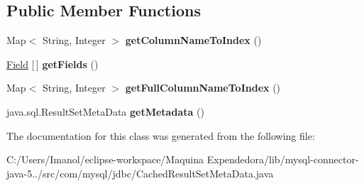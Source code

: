 \subsection*{Public Member Functions}
\begin{DoxyCompactItemize}
\item 
\mbox{\label{classcom_1_1mysql_1_1jdbc_1_1_cached_result_set_meta_data_ac531dfc6581f67cec568ff305a392794}} 
Map$<$ String, Integer $>$ {\bfseries get\+Column\+Name\+To\+Index} ()
\item 
\mbox{\label{classcom_1_1mysql_1_1jdbc_1_1_cached_result_set_meta_data_a72c9658d05d246f0f987bb474e15ce94}} 
\mbox{\hyperlink{classcom_1_1mysql_1_1jdbc_1_1_field}{Field}} \mbox{[}$\,$\mbox{]} {\bfseries get\+Fields} ()
\item 
\mbox{\label{classcom_1_1mysql_1_1jdbc_1_1_cached_result_set_meta_data_add18c14773251a3b33b3010b7f244120}} 
Map$<$ String, Integer $>$ {\bfseries get\+Full\+Column\+Name\+To\+Index} ()
\item 
\mbox{\label{classcom_1_1mysql_1_1jdbc_1_1_cached_result_set_meta_data_a85a7e773a09d9eb72922873df4150cd4}} 
java.\+sql.\+Result\+Set\+Meta\+Data {\bfseries get\+Metadata} ()
\end{DoxyCompactItemize}


The documentation for this class was generated from the following file\+:\begin{DoxyCompactItemize}
\item 
C\+:/\+Users/\+Imanol/eclipse-\/workspace/\+Maquina Expendedora/lib/mysql-\/connector-\/java-\/5../src/com/mysql/jdbc/Cached\+Result\+Set\+Meta\+Data.\+java\end{DoxyCompactItemize}
